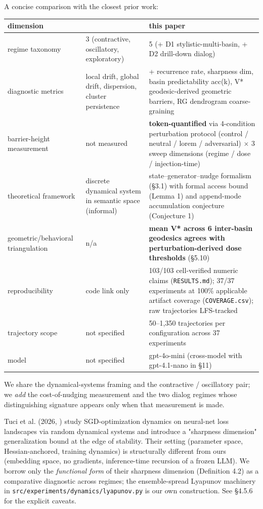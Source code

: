 \documentclass{article}
\theoremstyle{plain}
\theoremstyle{definition}
\begin{document}
A concise comparison with the closest prior work:

\begin{table}[h!]
\centering
\small
\begin{tabular}{lll}
\toprule
dimension & \citep{arxiv251210350} & this paper \\
\midrule
regime taxonomy & 3 (contractive, oscillatory, exploratory) & 5 (+ D1 stylistic-multi-basin, + D2 drill-down dialog) \\
diagnostic metrics & local drift, global drift, dispersion, cluster persistence & + recurrence rate, sharpness dim, basin predictability acc(k), V* geodesic-derived geometric barriers, RG dendrogram coarse-graining \\
barrier-height measurement & not measured & \textbf{token-quantified} via 4-condition perturbation protocol (control / neutral / lorem / adversarial) × 3 sweep dimensions (regime / dose / injection-time) \\
theoretical framework & discrete dynamical system in semantic space (informal) & state–generator–nudge formalism (§3.1) with formal access bound (Lemma 1) and append-mode accumulation conjecture (Conjecture 1) \\
geometric/behavioral triangulation & n/a & \textbf{mean V* across 6 inter-basin geodesics agrees with perturbation-derived dose thresholds} (§5.10) \\
reproducibility & code link only & 103/103 cell-verified numeric claims (\texttt{RESULTS.md}); 37/37 experiments at 100\% applicable artifact coverage (\texttt{COVERAGE.csv}); raw trajectories LFS-tracked \\
trajectory scope & not specified & 50–1,350 trajectories per configuration across 37 experiments \\
model & not specified & gpt-4o-mini (cross-model with gpt-4.1-nano in §11) \\
\bottomrule
\end{tabular}
\end{table}

We share the dynamical-systems framing and the contractive /
oscillatory pair; we \textit{add} the cost-of-nudging measurement and the
two dialog regimes whose distinguishing signature appears only when
that measurement is made.

Tuci et al. (2026, \citep{arxiv260419740}) study SGD-optimization dynamics
on neural-net loss landscapes via random dynamical systems and
introduce a "sharpness dimension" generalization bound at the edge
of stability. Their setting (parameter space, Hessian-anchored,
training dynamics) is structurally different from ours (embedding
space, no gradients, inference-time recursion of a frozen LLM). We
borrow only the \textit{functional form} of their sharpness dimension
(Definition 4.2) as a comparative diagnostic across regimes; the
ensemble-spread Lyapunov machinery in
\texttt{src/experiments/dynamics/lyapunov.py} is our own construction. See
§4.5.6 for the explicit caveats.
\end{document}

